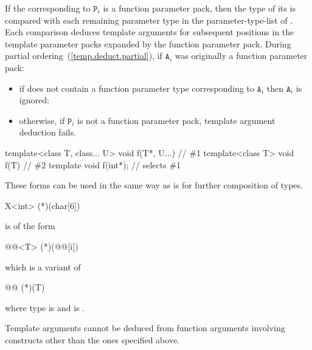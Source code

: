 If the 
corresponding to $\texttt{P}_i$ is a function parameter pack,
then the type of its  is compared with
each remaining parameter type in the parameter-type-list
of . Each comparison deduces template arguments for
subsequent positions in the template parameter packs expanded by the
function parameter pack.
During partial ordering~(\ref{temp.deduct.partial}), if $\texttt{A}_i$ was
originally a function parameter pack:

\begin{itemize}
\item if  does not contain a function parameter type corresponding to
$\texttt{A}_i$ then $\texttt{A}_i$ is ignored;

\item otherwise, if $\texttt{P}_i$ is not a function parameter pack, template
argument deduction fails.
\end{itemize}
\begin{example}
\begin{codeblock}
template<class T, class... U> void f(T*, U...) { }    // \#1
template<class T>             void f(T) { }           // \#2
template void f(int*);      // selects \#1
\end{codeblock}
\end{example}

\pnum
These forms can be used in the same way as
is for further composition of types.
\begin{example}

\begin{codeblock}
X<int> (*)(char[6])
\end{codeblock}

is of the form

\begin{codeblock}
@@<T> (*)(@@[i])
\end{codeblock}

which is a variant of

\begin{codeblock}
@@ (*)(T)
\end{codeblock}

where type is
and
is
.
\end{example}

\pnum
Template arguments cannot be deduced from function arguments involving
constructs other than the ones specified above.

